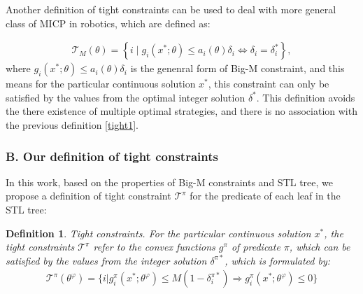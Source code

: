 \documentclass[a4paper]{report}
\newtheorem{myDef}{Definition}
\begin{document}

Another definition of tight constraints \cite[]{Cauligi2020} can be used to deal with more general class of MICP in robotics, which are defined as:

\begin{equation}
\label{tight2}%
    \begin{aligned}
        \mathcal{T}_M(\theta)=\left\{i \mid g_i\left(x^* ; \theta\right) \leq a_i(\theta) \delta_i \Longleftrightarrow \delta_i=\delta_i^*\right\},
    \end{aligned} 
\end{equation}
where $g_i(x^* ; \theta) \leq a_i(\theta) \delta_i$ is the genenral form of Big-M constraint, and this means for the particular continuous solution $x^*$, this constraint can only be satisfied by the values from the optimal integer solution $\delta^*$. This definition avoids the there existence of multiple optimal strategies, and there is no association with the previous definition \ref*{tight1}.

\subsubsection*{B. Our definition of tight constraints}
In this work, based on the properties of Big-M constraints and STL tree, we propose a definition of tight constraint $\mathcal{T}^\pi$ for the predicate of each leaf in the STL tree:

\begin{myDef} Tight constraints.
\label{tight3}%
    For the particular continuous solution $x^*$, the tight constraints $\mathcal{T}^\pi$ refer to the convex functions $g^\pi$ 
    of predicate $\pi$, which can be satisfied by the values from the integer solution $\delta^{\pi*}$, which is formulated by:
    \begin{equation}
        \begin{aligned}
            \mathcal{T}^\pi(\theta^\varphi) = \{i|g_i^\pi(x^*;\theta^\varphi) \leq M(1-\delta_i^{\pi*}) 
            \Longrightarrow 
            g_i^\pi(x^*;\theta^\varphi) \leq 0\}
        \end{aligned}
    \end{equation}
\end{myDef}
\end{document}

